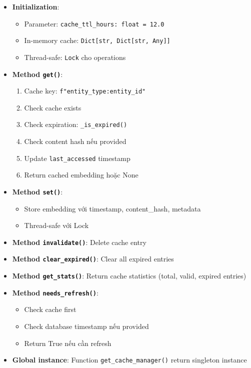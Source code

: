 \begin{itemize}
    \item \textbf{Initialization}:
    \begin{itemize}
        \item Parameter: \texttt{cache\_ttl\_hours: float = 12.0}
        \item In-memory cache: \texttt{Dict[str, Dict[str, Any]]}
        \item Thread-safe: \texttt{Lock} cho operations
    \end{itemize}
    
    \item \textbf{Method \texttt{get()}}:
    \begin{enumerate}
        \item Cache key: \texttt{f"{entity\_type}:{entity\_id}"}
        \item Check cache exists
        \item Check expiration: \texttt{\_is\_expired()}
        \item Check content hash nếu provided
        \item Update \texttt{last\_accessed} timestamp
        \item Return cached embedding hoặc None
    \end{enumerate}
    
    \item \textbf{Method \texttt{set()}}:
    \begin{itemize}
        \item Store embedding với timestamp, content\_hash, metadata
        \item Thread-safe với Lock
    \end{itemize}
    
    \item \textbf{Method \texttt{invalidate()}}: Delete cache entry
    
    \item \textbf{Method \texttt{clear\_expired()}}: Clear all expired entries
    
    \item \textbf{Method \texttt{get\_stats()}}: Return cache statistics (total, valid, expired entries)
    
    \item \textbf{Method \texttt{needs\_refresh()}}:
    \begin{itemize}
        \item Check cache first
        \item Check database timestamp nếu provided
        \item Return True nếu cần refresh
    \end{itemize}
    
    \item \textbf{Global instance}: Function \texttt{get\_cache\_manager()} return singleton instance
\end{itemize}


